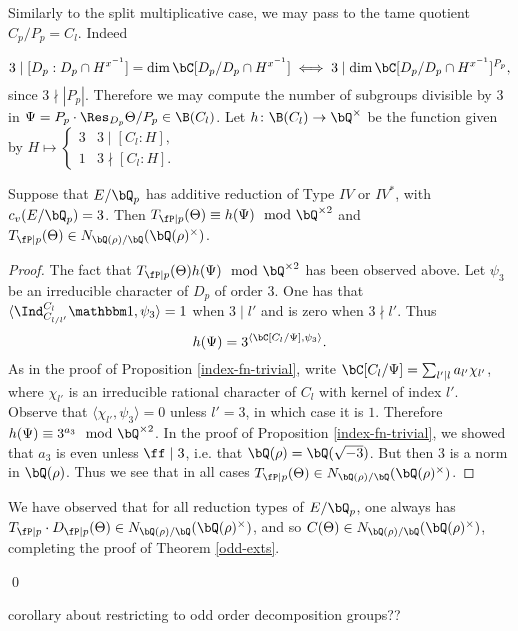 Similarly to the split multiplicative case, we may pass to the tame quotient $C_p / P_p = C_l$. Indeed 

\[ 3 \mid  [D_p : D_p \cap H^{x^{-1}}] = \dim \bC [ D_p / D_p \cap H^{x^{-1}}] \iff 3 \mid \dim \bC[ D_p / D_p \cap H^{x^{-1}} ]^{P_p},\] 
since $3 \nmid|P_p|$. Therefore we may compute the number of subgroups divisible by $3$ in $\Psi = P_p \cdot \Res_{D_p} \Theta / P_p \in \B(C_l)$.  Let $h \colon \B(C_l) \to \bQ^{\times}$ be the function given by $H \mapsto \begin{cases} 3 & 3 \mid [C_l : H], \\ 1 & 3 \nmid [C_l : H]. \end{cases}$

\begin{prop}
   Suppose that $E / \bQ_p$ has additive reduction of Type $IV$ or $IV^*$, with $c_v(E / \bQ_p) = 3$.  Then $T_{\fP \mid p}(\Theta) \equiv h(\Psi) \mod \bQ^{\times 2}$ and $T_{\fP \mid p}(\Theta) \in \fieldnorm{\rho}$. 
\end{prop}

\begin{proof}
The fact that $T_{\fP \mid p}(\Theta)  h(\Psi) \mod \bQ^{\times 2}$ has been observed above.
Let $\psi_3$ be an irreducible character of $D_p$ of order $3$. One has that $ \langle \Ind_{C_{l / l'}}^{C_l} \trivial , \psi_3 \rangle =  1$ when $3 \mid l'$ and is zero when  $3 \nmid l'$. 
Thus $$h(\Psi) = 3^{\langle \bC[C_l / \Psi], \psi_3 \rangle}.$$ As in the proof of Proposition \ref{index-fn-trivial}, write $\bC[C_l / \Psi] = \sum_{l' \mid l} a_{l'} \chi_{l'}$, where $\chi_{l'}$ is an irreducible rational character of $C_l$ with kernel of index $l'$. Observe that $\langle \chi_{l'}, \psi_3 \rangle = 0$ unless $l' = 3$, in which case it is $1$. Therefore $h(\Psi) \equiv 3^{a_3} \mod \bQ^{\times 2}$. In the proof of Proposition \ref{index-fn-trivial}, we showed that $a_3$ is even unless $\ff \mid 3$,  i.e. that $\bQ(\rho) = \bQ(\sqrt{-3})$. But then $3$ is a norm in $\bQ(\rho)$. Thus we see that in all cases $T_{\fP \mid p}(\Theta) \in N_{\bQ(\rho) / \bQ}(\bQ(\rho)^{\times})$. 
\end{proof}

We have observed that for all reduction types of $E / \bQ_p$, one always has $T_{\fP \mid p} \cdot D_{\fP \mid p}(\Theta) \in \fieldnorm{\rho}$, and so $C(\Theta) \in \fieldnorm{\rho}$, completing the proof of Theorem \ref{odd-exts}.

\qed

{\color{red} corollary about restricting to odd order decomposition groups??}

